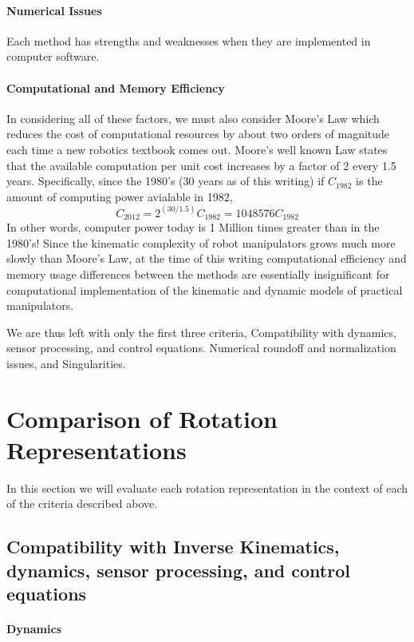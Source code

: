 \paragraph{Numerical Issues}
Each method has strengths and weaknesses when they are implemented in computer software.

\paragraph{Computational and Memory Efficiency}
In considering all of these factors, we must also consider Moore's Law which reduces the cost of computational resources by about two orders of magnitude each time a new robotics textbook comes out.   Moore's well known Law states that the available computation per unit cost increases by a factor of 2 every 1.5 years.
Specifically, since the 1980's (30 years as of this writing) if $C_{1982}$ is the amount of computing power avialable in 1982,
\[
C_{2012} = 2^{(30/1.5)}C_{1982} = 1048576C_{1982}
\]
In other words, computer power today is 1 Million times greater than in the 1980's!
 Since the kinematic complexity of robot manipulators grows much more slowly than Moore's Law, at the time of this writing computational efficiency and memory usage differences between the methods are essentially insignificant for computational implementation of the kinematic and dynamic models of practical manipulators.

We are thus left with only the first three criteria,
 Compatibility with dynamics, sensor processing, and control equations.
 Numerical roundoff and normalization issues,  and
 Singularities.


\section{Comparison of Rotation Representations}
In this section we will evaluate each rotation representation in the context of each of the criteria described above.

\subsection{Compatibility with Inverse Kinematics, dynamics, sensor processing, and control equations}


\paragraph{Dynamics}

